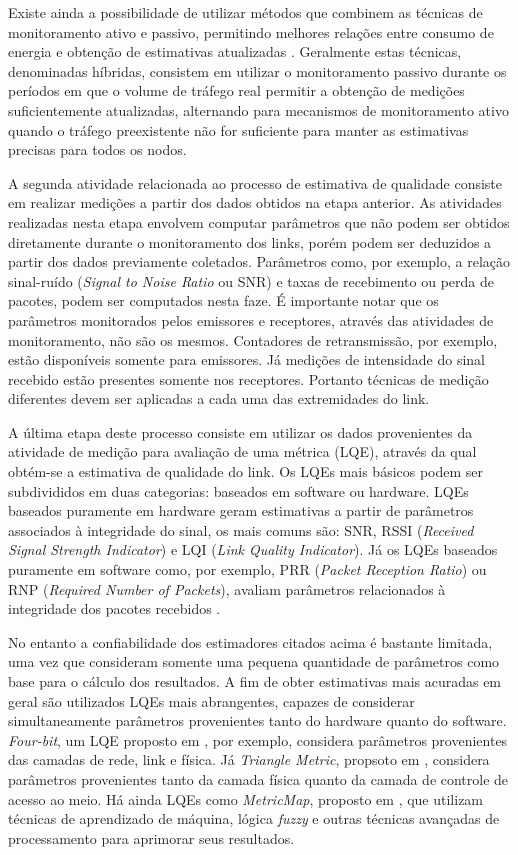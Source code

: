 \documentclass[
	12pt,				%
	openright,			%
	oneside,
	a4paper,			%
	english,			%
	french,				%
	spanish,			%
	brazil				%
	]{abntex2}
\begin{document}
Existe ainda a possibilidade de utilizar métodos que combinem as técnicas de monitoramento ativo e passivo, permitindo melhores relações entre consumo de energia e obtenção de estimativas atualizadas \cite{Gnawali2009,Kim2006}. Geralmente estas técnicas, denominadas híbridas, consistem em utilizar o monitoramento passivo durante os períodos em que o volume de tráfego real permitir a obtenção de medições suficientemente atualizadas, alternando para mecanismos de monitoramento ativo quando o tráfego preexistente não for suficiente para manter as estimativas precisas para todos os nodos.

A segunda atividade relacionada ao processo de estimativa de qualidade consiste em realizar medições a partir dos dados obtidos na etapa anterior. As atividades realizadas nesta etapa envolvem computar parâmetros que não podem ser obtidos diretamente durante o monitoramento dos links, porém podem ser deduzidos a partir dos dados previamente coletados. Parâmetros como, por exemplo, a relação sinal-ruído (\textit{Signal to Noise Ratio} ou SNR) e taxas de recebimento ou perda de pacotes, podem ser computados nesta faze. É importante notar que os parâmetros monitorados pelos emissores e receptores, através das atividades de monitoramento, não são os mesmos. Contadores de retransmissão, por exemplo, estão disponíveis somente para emissores. Já medições de intensidade do sinal recebido estão presentes somente nos receptores. Portanto técnicas de medição diferentes devem ser aplicadas a cada uma das extremidades do link.

A última etapa deste processo consiste em utilizar os dados provenientes da atividade de medição para avaliação de uma métrica (LQE), através da qual obtém-se a estimativa de qualidade do link. Os LQEs mais básicos podem ser subdivididos em duas categorias: baseados em software ou hardware. LQEs baseados puramente em hardware geram estimativas a partir de parâmetros associados à integridade do sinal, os mais comuns são: SNR, RSSI (\textit{Received Signal Strength Indicator}) e LQI (\textit{Link Quality Indicator}). Já os LQEs baseados puramente em software como, por exemplo, PRR (\textit{Packet Reception Ratio}) ou RNP (\textit{Required Number of Packets}), avaliam parâmetros relacionados à integridade dos pacotes recebidos \cite{Baccour2012}.

No entanto a confiabilidade dos estimadores citados acima é bastante limitada, uma vez que consideram somente uma pequena quantidade de parâmetros como base para o cálculo dos resultados. A fim de obter estimativas mais acuradas em geral são utilizados LQEs mais abrangentes, capazes de considerar simultaneamente parâmetros provenientes tanto do hardware quanto do software. \textit{Four-bit}, um LQE proposto em , por exemplo, considera parâmetros provenientes das camadas de rede, link e física. Já \textit{Triangle Metric}, propsoto em , considera parâmetros provenientes tanto da camada física quanto da camada de controle de acesso ao meio. Há ainda LQEs como \textit{MetricMap}, proposto em , que utilizam técnicas de aprendizado de máquina, lógica \textit{fuzzy} e outras técnicas avançadas de processamento para aprimorar seus resultados.
\end{document}
